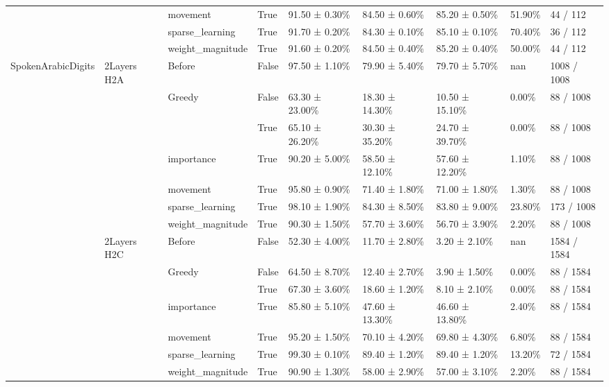 \begin{tabular}{lllllllll}
\cline{3-9}
 &  & movement & True & 91.50 ± 0.30\% & 84.50 ± 0.60\% & 85.20 ± 0.50\% & 51.90\% & 44 / 112 \\
\cline{3-9}
 &  & sparse\_learning & True & 91.70 ± 0.20\% & 84.30 ± 0.10\% & 85.10 ± 0.10\% & 70.40\% & 36 / 112 \\
\cline{3-9}
 &  & weight\_magnitude & True & 91.60 ± 0.20\% & 84.50 ± 0.40\% & 85.20 ± 0.40\% & 50.00\% & 44 / 112 \\
\cline{1-9} \cline{2-9} \cline{3-9}
\multirow[t]{35}{*}{SpokenArabicDigits} & \multirow[t]{7}{*}{2Layers H2A} & Before & False & 97.50 ± 1.10\% & 79.90 ± 5.40\% & 79.70 ± 5.70\% & nan & 1008 / 1008 \\
\cline{3-9}
 &  & \multirow[t]{2}{*}{Greedy} & False & 63.30 ± 23.00\% & 18.30 ± 14.30\% & 10.50 ± 15.10\% & 0.00\% & 88 / 1008 \\
 &  &  & True & 65.10 ± 26.20\% & 30.30 ± 35.20\% & 24.70 ± 39.70\% & 0.00\% & 88 / 1008 \\
\cline{3-9}
 &  & importance & True & 90.20 ± 5.00\% & 58.50 ± 12.10\% & 57.60 ± 12.20\% & 1.10\% & 88 / 1008 \\
\cline{3-9}
 &  & movement & True & 95.80 ± 0.90\% & 71.40 ± 1.80\% & 71.00 ± 1.80\% & 1.30\% & 88 / 1008 \\
\cline{3-9}
 &  & sparse\_learning & True & 98.10 ± 1.90\% & 84.30 ± 8.50\% & 83.80 ± 9.00\% & 23.80\% & 173 / 1008 \\
\cline{3-9}
 &  & weight\_magnitude & True & 90.30 ± 1.50\% & 57.70 ± 3.60\% & 56.70 ± 3.90\% & 2.20\% & 88 / 1008 \\
\cline{2-9} \cline{3-9}
 & \multirow[t]{7}{*}{2Layers H2C} & Before & False & 52.30 ± 4.00\% & 11.70 ± 2.80\% & 3.20 ± 2.10\% & nan & 1584 / 1584 \\
\cline{3-9}
 &  & \multirow[t]{2}{*}{Greedy} & False & 64.50 ± 8.70\% & 12.40 ± 2.70\% & 3.90 ± 1.50\% & 0.00\% & 88 / 1584 \\
 &  &  & True & 67.30 ± 3.60\% & 18.60 ± 1.20\% & 8.10 ± 2.10\% & 0.00\% & 88 / 1584 \\
\cline{3-9}
 &  & importance & True & 85.80 ± 5.10\% & 47.60 ± 13.30\% & 46.60 ± 13.80\% & 2.40\% & 88 / 1584 \\
\cline{3-9}
 &  & movement & True & 95.20 ± 1.50\% & 70.10 ± 4.20\% & 69.80 ± 4.30\% & 6.80\% & 88 / 1584 \\
\cline{3-9}
 &  & sparse\_learning & True & 99.30 ± 0.10\% & 89.40 ± 1.20\% & 89.40 ± 1.20\% & 13.20\% & 72 / 1584 \\
\cline{3-9}
 &  & weight\_magnitude & True & 90.90 ± 1.30\% & 58.00 ± 2.90\% & 57.00 ± 3.10\% & 2.20\% & 88 / 1584 \\

\end{tabular}
